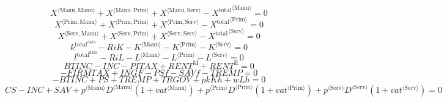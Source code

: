 \begin{equation}
{X}^{\langle \mathrm{Manu},\mathrm{Manu}\rangle} + {X}^{\langle \mathrm{Manu},\mathrm{Prim}\rangle} + {X}^{\langle \mathrm{Manu},\mathrm{Serv}\rangle} - {X^{\mathrm{total}}}^{\langle \mathrm{Manu}\rangle} = 0
\end{equation}
\begin{equation}
{X}^{\langle \mathrm{Prim},\mathrm{Manu}\rangle} + {X}^{\langle \mathrm{Prim},\mathrm{Prim}\rangle} + {X}^{\langle \mathrm{Prim},\mathrm{Serv}\rangle} - {X^{\mathrm{total}}}^{\langle \mathrm{Prim}\rangle} = 0
\end{equation}
\begin{equation}
{X}^{\langle \mathrm{Serv},\mathrm{Manu}\rangle} + {X}^{\langle \mathrm{Serv},\mathrm{Prim}\rangle} + {X}^{\langle \mathrm{Serv},\mathrm{Serv}\rangle} - {X^{\mathrm{total}}}^{\langle \mathrm{Serv}\rangle} = 0
\end{equation}
\begin{equation}
k^{\mathrm{total}^{\mathrm{data}}} - {R\!i\!K} - {K}^{\langle \mathrm{Manu}\rangle} - {K}^{\langle \mathrm{Prim}\rangle} - {K}^{\langle \mathrm{Serv}\rangle} = 0
\end{equation}
\begin{equation}
l^{\mathrm{total}^{\mathrm{data}}} - {R\!i\!L} - {L}^{\langle \mathrm{Manu}\rangle} - {L}^{\langle \mathrm{Prim}\rangle} - {L}^{\langle \mathrm{Serv}\rangle} = 0
\end{equation}
\begin{equation}
{B\!T\!I\!N\!C} - {I\!N\!C} - {P\!I\!T\!A\!X} + {R\!E\!N\!T}^{\mathrm{M}} + {R\!E\!N\!T}^{\mathrm{E}} = 0
\end{equation}
\begin{equation}
-{F\!I\!R\!M\!T\!A\!X} + {I\!N\!G\!F} - {P\!S\!f} - {S\!A\!V\!f} - {T\!R\!E\!M\!P} = 0
\end{equation}
\begin{equation}
-{B\!T\!I\!N\!C} + {P\!S} + {T\!R\!E\!M\!P} + {T\!R\!G\!O\!V} + {{p\!k}} {{K\!h}} + {w} {{L\!h}} = 0
\end{equation}
\begin{equation}
{C\!S} - {I\!N\!C} + {S\!A\!V} + {{p}^{\langle \mathrm{Manu}\rangle}} {{D}^{\langle \mathrm{Manu}\rangle}} \left(1 + {{v\!a\!t}}^{\langle \mathrm{\mathrm{Manu}}\rangle}\right) + {{p}^{\langle \mathrm{Prim}\rangle}} {{D}^{\langle \mathrm{Prim}\rangle}} \left(1 + {{v\!a\!t}}^{\langle \mathrm{\mathrm{Prim}}\rangle}\right) + {{p}^{\langle \mathrm{Serv}\rangle}} {{D}^{\langle \mathrm{Serv}\rangle}} \left(1 + {{v\!a\!t}}^{\langle \mathrm{\mathrm{Serv}}\rangle}\right) = 0
\end{equation}
